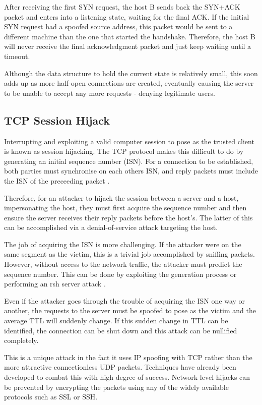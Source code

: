 \documentclass[12pt,twoside]{article}
\begin{document}
After receiving the first SYN request, the host B sends back the SYN+ACK packet and enters into a listening state, waiting for the final ACK. If the initial SYN request had a spoofed source address, this packet would be sent to a different machine than the one that started the handshake. Therefore, the host B will never receive the final acknowledgment packet and just keep waiting until a timeout. 

Although the data structure to hold the current state is relatively small, this soon adds up as more half-open connections are created, eventually causing the server to be unable to accept any more requests - denying legitimate users.

\subsection{TCP Session Hijack} \label{hijack}
Interrupting and exploiting a valid computer session to pose as the trusted client is known as session hijacking. The TCP protocol makes this difficult to do by generating an initial sequence number (ISN). For a connection to be established, both parties must synchronise on each others ISN, and reply packets must include the ISN of the preceeding packet \cite{rfc793}. 

Therefore, for an attacker to hijack the session between a server and a host, impersonating the host, they must first acquire the sequence number and then ensure the server receives their reply packets before the host's. The latter of this can be accomplished via a denial-of-service attack targeting the host.

The job of acquiring the ISN is more challenging. If the attacker were on the same segment as the victim, this is a trivial job accomplished by sniffing packets. However, without access to the network traffic, the attacker must predict the sequence number. This can be done by exploiting the generation process or performing an rsh server attack \cite{tcphijacking}.

Even if the attacker goes through the trouble of acquiring the ISN one way or another, the requests to the server must be spoofed to pose as the victim and the average TTL will suddenly change. If this sudden change in TTL can be identified, the connection can be shut down and this attack can be nullified completely.

This is a unique attack in the fact it uses IP spoofing with TCP rather than the more attractive connectionless UDP packets. Techniques have already been developed to combat this with high degree of success. Network level hijacks can be prevented by encrypting the packets using any of the widely available protocols such as SSL or SSH.
\end{document}

